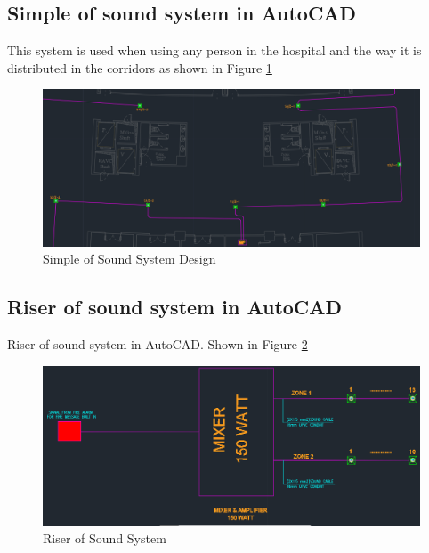 \documentclass[12pt,fleqn]{book} %
\begin{document}
\subsection{Simple of sound system in AutoCAD }
This system is used when using any person in the hospital and the way it is distributed in the corridors as shown in Figure \ref{fig:sound new 2}
\begin{figure}[!h]
    \centering
    \includegraphics[width=1\linewidth]{sound new 2.png}
    \caption{Simple of Sound System Design}
    \label{fig:sound new 2}
    \end{figure}
\subsection{Riser of sound system in AutoCAD }
Riser of sound system in AutoCAD. Shown in Figure \ref{fig:sound new 3}
\begin{figure}[!h]
    \centering
    \includegraphics[width=1\linewidth]{sound new 3.png}
    \caption{Riser of Sound System}
    \label{fig:sound new 3}
    \end{figure}
\end{document}
